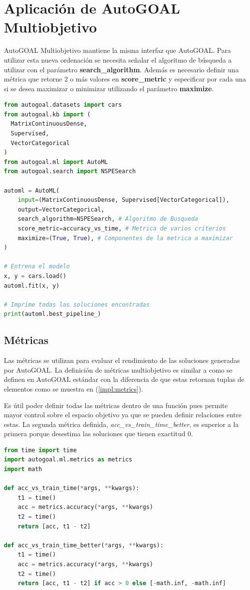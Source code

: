\section{Aplicaci\'on de AutoGOAL Multiobjetivo}
AutoGOAL Multiobjetivo mantiene la misma interfaz que AutoGOAL. Para utilizar esta nueva ordenaci\'on se necesita  se\~nalar el algoritmo de b\'usqueda a utilizar con el par\'ametro \textbf{search\_algorithm}. Adem\'as es necesario definir una m\'etrica que retorne 2 o m\'as valores en \textbf{score\_metric} y especificar por cada una si se desea maximizar o minimizar utilizando el par\'ametro  \textbf{maximize}. 

\begin{lstlisting}[caption=Uso de AutoGOAL con multiobjetivo, language=Python]
from autogoal.datasets import cars
from autogoal.kb import (
  MatrixContinuousDense,
  Supervised,
  VectorCategorical
)
from autogoal.ml import AutoML
from autogoal.search import NSPESearch

automl = AutoML(
    input=(MatrixContinuousDense, Supervised[VectorCategorical]),
    output=VectorCategorical,
    search_algorithm=NSPESearch, # Algoritmo de Busqueda
    score_metric=accuracy_vs_time, # Metrica de varios criterios
    maximize=(True, True), # Componentes de la metrica a maximizar
)

# Entrena el modelo
x, y = cars.load()
automl.fit(x, y)

# Imprime todas las soluciones encontradas
print(automl.best_pipeline_) 
\end{lstlisting}

\subsection{M\'etricas}
Las m\'etricas se utilizan para evaluar el rendimiento de las soluciones generadas por AutoGOAL.
La definici\'on de m\'etricas multiobjetivo  es similar a como se definen en AutoGOAL est\'andar con la diferencia de que estas retornan tuplas de elementos como se muestra en (\ref{impl:metrics}). 

Es \'util poder definir todas las m\'etricas dentro de una funci\'on pues permite mayor control sobre el espacio objetivo ya que se pueden definir relaciones entre estas. La segunda m\'etrica definida, \textit{acc\_vs\_train\_time\_better}, es superior a la primera porque desestima las soluciones que tienen exactitud 0.

\begin{lstlisting}[caption=Ejemplo de m\'etrica: \textit{accuracy} contra tiempo, language=Python, label=impl:metrics]
from time import time
import autogoal.ml.metrics as metrics
import math

def acc_vs_train_time(*args, **kwargs):
    t1 = time()
    acc = metrics.accuracy(*args, **kwargs)
    t2 = time()
    return [acc, t1 - t2]

def acc_vs_train_time_better(*args, **kwargs):
    t1 = time()
    acc = metrics.accuracy(*args, **kwargs)
    t2 = time()
    return [acc, t1 - t2] if acc > 0 else [-math.inf, -math.inf]
\end{lstlisting}
